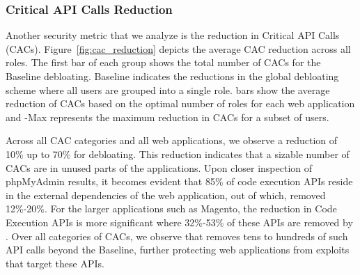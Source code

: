 \subsubsection{Critical API Calls Reduction}

Another security metric that we analyze is the reduction in Critical API Calls (CACs). 
Figure~\ref{fig:cac_reduction} depicts the average CAC reduction across all roles. 
The first bar of each group shows the total number of CACs for the Baseline debloating. 
Baseline indicates the reductions in the global debloating scheme where all users are grouped into a single role. 
\dbltr{} bars show the average reduction of CACs based on the optimal number of roles for each web application and \dbltr{}-Max represents the maximum reduction in CACs for a subset of users. 

Across all CAC categories and all web applications, we observe a reduction of 10\% up to 70\% for \dbltr{} debloating. 
This reduction indicates that a sizable number of CACs are in unused parts of the applications. Upon closer inspection of phpMyAdmin results, it becomes evident that 85\% of code execution APIs reside in the external dependencies of the web application, out of which, \dbltr{} removed 12\%-20\%. 
For the larger applications such as Magento, the reduction in Code Execution APIs is more significant where 32\%-53\% of these APIs are removed by \dbltr{}.
Over all categories of CACs, we observe that \dbltr{} removes tens to hundreds of such API calls beyond the Baseline, further protecting web applications from exploits that target these APIs. 

\begin{table}[t]
    \centering
    \caption{PHP Object Injection Gadgets statistics after debloating. Listing number of existing gadgets for Baseline and the percentage of roles in \dbltr{} exposed to those gadgets.}
    \label{tab:poi_gadgets}
\end{table}

